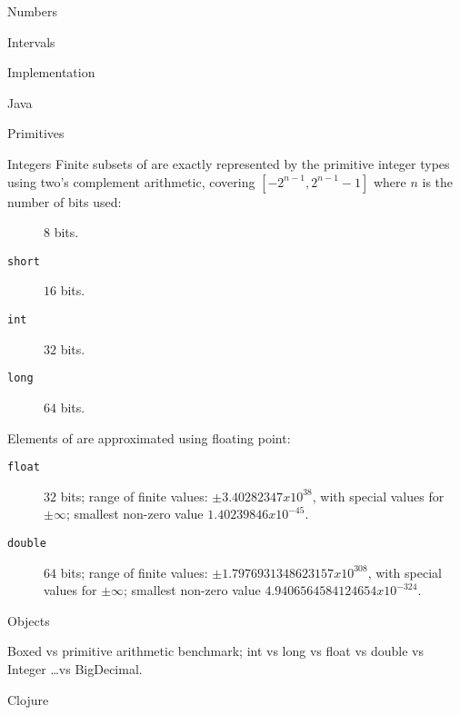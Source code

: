 \begin{plSection}{Numbers}
\begin{plSection}{Intervals}
\end{plSection}%
\begin{plSection}{Implementation}
\begin{plSection}{Java}
\lstset{language=Java}
\begin{plSection}{Primitives}
\end{plSection}%
\begin{plSection}{Integers}
Finite subsets of  are exactly
represented by the primitive integer types using two's complement arithmetic, 
covering $[−2^{n−1}, 2^{n−1} − 1]$ where $n$ is the number of bits used:
\begin{description}
\item[] $8$ bits.
\item[\texttt{short}] $16$ bits.
\item[\texttt{int}] $32$ bits.
\item[\texttt{long}] $64$ bits.
\end{description}

Elements of  are approximated using floating
point:
\begin{description}
\item[\texttt{float}] $32$ bits; range of finite values:
$\pm 3.40282347 x 10^{38}$, with special values for $\pm\infty$;
smallest non-zero value $1.40239846 x 10^{-45}$.
\item[\texttt{double}] $64$ bits;
range of finite values: 
$\pm 1.7976931348623157 x 10^{308}$, with special values for $\pm\infty$;
smallest non-zero value $4.9406564584124654 x 10^{-324}$.
\end{description}

\end{plSection}%
\begin{plSection}{Objects}

Boxed vs primitive arithmetic benchmark; 
int vs long vs float vs double vs Integer \ldots vs BigDecimal.

\end{plSection}%
\end{plSection}%
\begin{plSection}{Clojure}
\lstset{language=Clojure}


\end{plSection}
\end{plSection}
\end{plSection}
